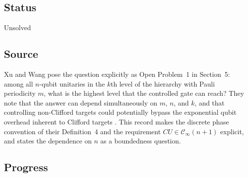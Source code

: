 \subsection*{Status}

Unsolved

\subsection*{Source}

Xu and Wang pose the question explicitly as Open Problem~1 in Section~5:
among all $n$-qubit unitaries in the $k$th level of the hierarchy with Pauli
periodicity $m$, what is the highest level that the controlled gate can reach?
They note that the answer can depend simultaneously on $m$, $n$, and $k$, and
that controlling non-Clifford targets could potentially bypass the exponential
qubit overhead inherent to Clifford targets
.  This record makes the discrete phase
convention of their Definition~4 and the requirement
$CU\in\mathcal C_\infty(n+1)$ explicit, and states the dependence on $n$ as a
boundedness question.

\subsection*{Progress}

